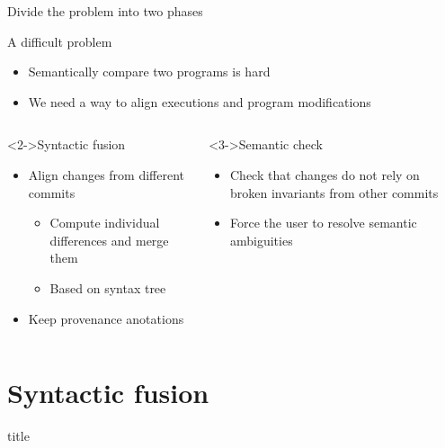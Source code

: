 \documentclass{beamer}
\newcommand{\sectiontitleframe}{
    \begin{frame}
        \vfill
        \centering
        \begin{beamercolorbox}[sep=8pt,center,shadow=true,rounded=true]{title}
            \usebeamerfont{title}\insertsectionhead\par%
        \end{beamercolorbox}
        \vfill
\end{frame}}
\begin{document}
\begin{frame}{Divide the problem into two phases}
\begin{alertblock}{A difficult problem}
\begin{itemize}
 \item Semantically compare two programs is hard
 \item We need a way to align executions and program modifications
\end{itemize}
\end{alertblock}
\begin{columns}
\begin{column}{0.45\textwidth}
\begin{block}<2->{Syntactic fusion}
\begin{itemize}
 \item Align changes from different commits
 \begin{itemize}
 \item Compute individual differences and merge them
 \item Based on syntax tree
 \end{itemize}
 \item Keep provenance anotations
\end{itemize}
\end{block}
\end{column}
\begin{column}{0.45\textwidth}
\begin{block}<3->{Semantic check}
\begin{itemize}
 \item Check that changes do not rely on broken invariants from other commits
 \item Force the user to resolve semantic ambiguities
\end{itemize}
\end{block}
\end{column}
\end{columns}
\end{frame}

\section{Syntactic fusion}
\sectiontitleframe
\end{document}
